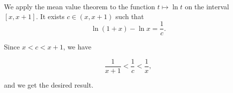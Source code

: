 \documentclass[12pt]{article}
\begin{document}
We apply the mean value theorem to the function $t\mapsto \ln t$ on the interval $[x,x+1]$. It exists $c\in (x,x+1)$ such that
$$ \ln(1+x)-\ln x= \frac1 c.$$

Since $x<c< x+1$, we have

$$\frac1{x+1}<\frac1 c<\frac1 x,$$

and we get the desired result.
\end{document}
